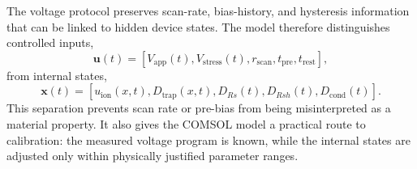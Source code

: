 The voltage protocol preserves scan-rate, bias-history, and hysteresis
information that can be linked to hidden device states. The model therefore
distinguishes controlled inputs,
\begin{equation}
\mathbf{u}(t)=
\left[V_{\mathrm{app}}(t), V_{\mathrm{stress}}(t),
r_{\mathrm{scan}}, t_{\mathrm{pre}}, t_{\mathrm{rest}}\right],
\end{equation}
from internal states,
\begin{equation}
\mathbf{x}(t)=
\left[u_{\mathrm{ion}}(x,t), D_{\mathrm{trap}}(x,t),
D_{Rs}(t), D_{Rsh}(t), D_{\mathrm{cond}}(t)\right].
\end{equation}
This separation prevents scan rate or pre-bias from being misinterpreted as a
material property. It also gives the COMSOL model a practical route to
calibration: the measured voltage program is known, while the internal states
are adjusted only within physically justified parameter ranges.
